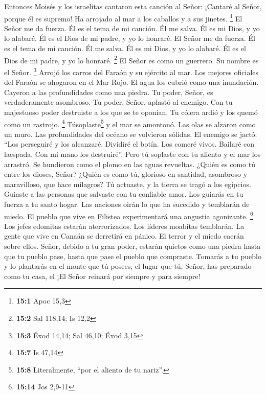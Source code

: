  Entonces Moisés y los israelitas cantaron esta canción al
Señor: ¡Cantaré al Señor, porque él es supremo! Ha arrojado al mar a los
caballos y a sus jinetes. \footnote{\textbf{15:1} Apoc 15,3}
 El Señor me da fuerza. Él es el tema de mi canción. Él me
salva. Él es mi Dios, y yo lo alabaré. Él es el Dios de mi padre, y yo
lo honraré. El Señor me da fuerza. Él es el tema de mi canción. Él me
salva. Él es mi Dios, y yo lo alabaré. Él es el Dios de mi padre, y yo
lo honraré. \footnote{\textbf{15:2} Sal 118,14; Is 12,2} 
El Señor es como un guerrero. Su nombre es el Señor. \footnote{\textbf{15:3}
  Éxod 14,14; Sal 46,10; Éxod 3,15}  Arrojó los carros del
Faraón y su ejército al mar. Los mejores oficiales del Faraón se
ahogaron en el Mar Rojo.  El agua los cubrió como una
inundación. Cayeron a las profundidades como una piedra. 
Tu poder, Señor, es verdaderamente asombroso. Tu poder, Señor, aplastó
al enemigo.  Con tu majestuoso poder destruiste a los que
se te oponían. Tu cólera ardió y los quemó como un rastrojo. \footnote{\textbf{15:7}
  Is 47,14}  Túsoplaste\footnote{\textbf{15:8}
  Literalmente, ``por el aliento de tu nariz''.} y el mar se amontonó.
Las olas se alzaron como un muro. Las profundidades del océano se
volvieron sólidas.  El enemigo se jactó: ``Los perseguiré
y los alcanzaré. Dividiré el botín. Los comeré vivos. Bailaré con
laespada. Con mi mano los destruiré''.  Pero tú soplaste
con tu aliento y el mar los arrastró. Se hundieron como el plomo en las
aguas revueltas.  ¿Quién es como tú entre los dioses,
Señor? ¿Quién es como tú, glorioso en santidad, asombroso y maravilloso,
que hace milagros?  Tú actuaste, y la tierra se tragó a
los egipcios.  Guiaste a las personas que salvaste con tu
confiable amor. Los guiarás en tu fuerza a tu santo hogar.
 Las naciones oirán lo que ha sucedido y temblarán de
miedo. El pueblo que vive en Filistea experimentará una angustia
agonizante. \footnote{\textbf{15:14} Jos 2,9-11}  Los
jefes edomitas estarán aterrorizados. Los líderes moabitas temblarán. La
gente que vive en Canaán se derretirá en pánico.  El
terror y el miedo caerán sobre ellos. Señor, debido a tu gran poder,
estarán quietos como una piedra hasta que tu pueblo pase, hasta que pase
el pueblo que compraste.  Tomarás a tu pueblo y lo
plantarás en el monte que tú posees, el lugar que tú, Señor, has
preparado como tu casa, el  ¡El Señor reinará por siempre
y para siempre!

